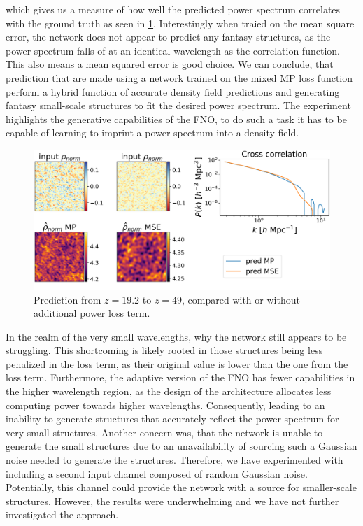 \documentclass{article}
\begin{document}
which gives us a measure of how well the predicted power spectrum correlates with the ground truth as seen in \ref{fig:power-loss-corr}. Interestingly when traied on the mean square error, the network does not appear to predict any fantasy structures, as the power spectrum falls of at an identical wavelength as the correlation function. This also means a mean squared error is good choice. We can conclude, that prediction that are made using a network trained on the mixed MP loss function perform a hybrid function of accurate density field predictions and generating fantasy small-scale structures to fit the desired power spectrum. The experiment highlights the generative capabilities of the FNO, to do such a task it has to be capable of learning to imprint a power spectrum into a density field.


\begin{figure}[h]
    \centering
    \includegraphics[width=0.8\linewidth]{img/compare_loss_correlation.png}
    \caption{Prediction from $z=19.2$ to $z=49$, compared with or without additional power loss term.}
    \label{fig:power-loss-corr}
\end{figure}

In the realm of the very small wavelengths, why the network still appears to be struggling. This shortcoming is likely rooted in those structures being less penalized in the loss term, as their original value is lower than the one from the loss term. Furthermore, the adaptive version of the FNO has fewer capabilities in the higher wavelength region, as the design of the architecture allocates less computing power towards higher wavelengths. Consequently, leading to an inability to generate structures that accurately reflect the power spectrum for very small structures. Another concern was, that the network is unable to generate the small structures due to an unavailability of sourcing such a Gaussian noise needed to generate the structures. Therefore, we have experimented with including a second  input channel composed of random Gaussian noise. Potentially, this channel could provide the network with a source for smaller-scale structures. However, the results were underwhelming and we have not further investigated the approach.
\end{document}
